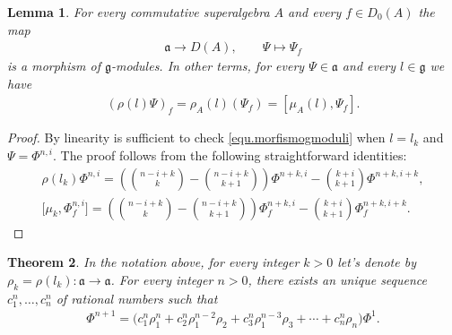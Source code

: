 \documentclass[11pt]{article}
\numberwithin{equation}{section}
\newtheorem{Theorem}{Theorem}[section]
\newtheorem{Lemma}[Theorem]{Lemma}
 { \theoremstyle{definition}
\newtheorem{Definition}[Theorem]{Definition}
\newtheorem{Example}[Theorem]{Example}
\newtheorem{Remark}[Theorem]{Remark} }
\begin{document}
\begin{Lemma} For every commutative superalgebra $A$ and every $f\in D_0(A)$ the map
\begin{gather*} \mathfrak{a}\to D(A),\qquad \Psi\mapsto \Psi_f\end{gather*}
is a morphism of $\mathfrak{g}$-modules. In other terms, for every $\Psi\in \mathfrak{a}$ and every $l\in \mathfrak{g}$ we have
\begin{gather}\label{equ.morfismogmoduli}
(\rho(l)\Psi)_f=\rho_A(l)(\Psi_f)=[\mu_A(l),\Psi_f] .
\end{gather}
\end{Lemma}

\begin{proof} By linearity is suf\/f\/icient to check \eqref{equ.morfismogmoduli} when $l=l_k$ and $\Psi=\Phi^{n,i}$. The proof follows from the following straightforward identities:
\begin{gather*}%
\rho(l_k)\Phi^{n,i}=\left(\binom{n-i+k}{k}-\binom{n-i+k}{k+1}\right)\Phi^{n+k,i}-\binom{k+i}{k+1}\Phi^{n+k,i+k},\\
\big[\mu_k,\Phi^{n,i}_f\big]=\left(\binom{n-i+k}{k}-\binom{n-i+k}{k+1}\right)\Phi^{n+k,i}_f-\binom{k+i}{k+1}\Phi^{n+k,i+k}_f.\tag*{\qed}
\end{gather*}
\renewcommand{\qed}{}
\end{proof}

\begin{Theorem}\label{thm.basisforPhienne}
In the notation above, for every integer $k>0$ let's denote by $\rho_k=\rho(l_k)\colon \mathfrak{a}\to \mathfrak{a}$.
For every integer $n>0$, there exists an unique sequence $c^n_1,\ldots,c^n_n$ of rational numbers such that
\begin{gather*}\Phi^{n+1}=\big(c^n_1\rho_1^n+c^n_2\rho_1^{n-2}\rho_2+c^n_3\rho_1^{n-3}\rho_3+\cdots+c^n_n\rho_n\big)\Phi^1.\end{gather*}
\end{Theorem}
\end{document}
